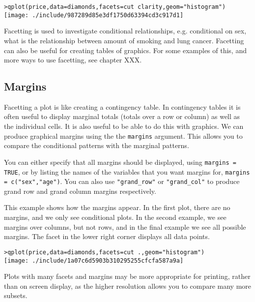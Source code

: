 \begin{alltt}
> qplot(price, data = diamonds, facets = cut ~ clarity, geom = "histogram")
\texttt{[image: ./include/987289d85e3df1750d63394cd3c917d1]}

\end{alltt}

Facetting is used to investigate conditional relationships, e.g. conditional on sex, what is the relationship between amount of smoking and lung cancer.  Facetting can also be useful for creating tables of graphics.  For some examples of this, and more ways to use facetting, see chapter XXX.

\subsection{Margins}\label{sub:margins}

Facetting a plot is like creating a contingency table.  In contingency tables it is often useful to display marginal totals (totals over a row or column) as well as the individual cells.  It is also useful to be able to do this with graphics.  We can produce graphical margins using the the {\tt margins} argument.  This allows you to compare the conditional patterns with the marginal patterns.

You can either specify that all margins should be displayed, using {\tt margins = TRUE}, or by listing the names of the variables that you want margins for, {\tt margins = c("sex","age")}.  You can also use \verb|"grand_row"| or \verb|"grand_col"| to produce grand row and grand column margins respectively.

This example shows how the margins appear.  In the first plot, there are no margins, and we only see conditional plots.  In the second example, we see margins over columns, but not rows, and in the final example we see all possible margins.  The facet in the lower right corner displays all data points.

\begin{alltt}
> qplot(price, data = diamonds, facets = cut ~ ., geom = "histogram")
\texttt{[image: ./include/1a07c6d5903b310295255cfcfa587a9a]}

\end{alltt}

Plots with many facets and margins may be more appropriate for printing, rather than on screen display, as the higher resolution allows you to compare many more subsets.

